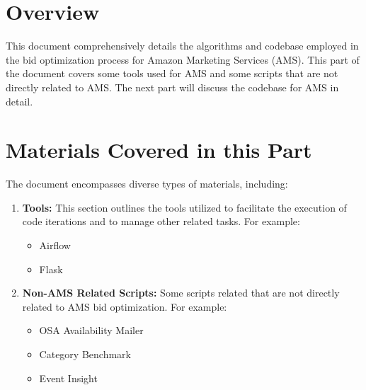 \section{Overview}
This document comprehensively details the algorithms and codebase employed in the bid optimization process for Amazon Marketing Services (AMS). This part of the document covers some tools used for AMS and some scripts that are not directly related to AMS. The next part will discuss the codebase for AMS in detail.

\section{Materials Covered in this Part}

The document encompasses diverse types of materials, including:

\begin{enumerate}
    \item \textbf{Tools:} This section outlines the tools utilized to facilitate the execution of code iterations and to manage other related tasks. For example:
          \begin{itemize}
              \item Airflow
              \item Flask
          \end{itemize}
    \item \textbf{Non-AMS Related Scripts:} Some scripts related that are not directly related to AMS bid optimization. For example:
          \begin{itemize}
              \item OSA Availability Mailer
              \item Category Benchmark
              \item Event Insight
          \end{itemize}
\end{enumerate}